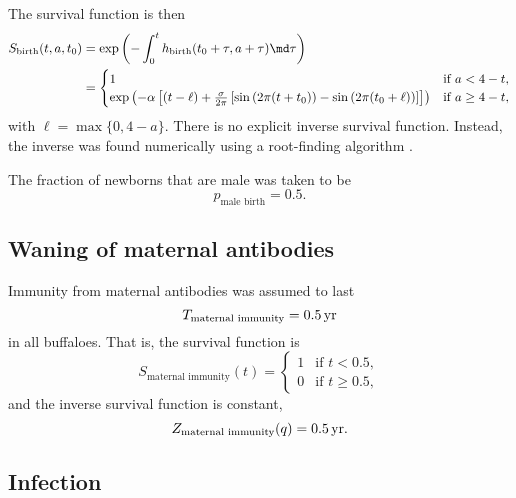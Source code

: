 \documentclass{jpmarticle}
\begin{document}
The survival function is then
\begin{equation}
  \begin{split}
    S_{\text{birth}}(t, a, t_0) &=
    \exp\left(- \int_0^t h_{\text{birth}}(t_0 + \tau, a + \tau) \md
      \tau\right)
    \\
    &=
    \begin{cases}
      1 & \text{if $a < 4 - t$},
      \\
      \exp\left(- \alpha \left[
          (t - \ell)
          + \frac{\sigma}{2 \pi}
          \left[\sin\left(2 \pi (t + t_0)\right)
            - \sin\left(2 \pi (t_0 + \ell)\right)\right]
        \right]
      \right)
      & \text{if $a \geq 4 - t$},
    \end{cases}
  \end{split}
\end{equation}
with $\ell = \max\{0, 4 - a\}$.  There is no explicit inverse survival
function.  Instead, the inverse was found numerically using a
root-finding algorithm \citep{scipy}.

The fraction of newborns that are male was taken to be
\begin{equation}
  p_{\text{male birth}} = 0.5.
\end{equation}


\subsection{Waning of maternal antibodies}

Immunity from maternal antibodies was assumed to last
\begin{equation}
  T_{\text{maternal immunity}} = \unit[0.5]{yr}
\end{equation}
in all buffaloes.  That is, the survival function is
\begin{equation}
  S_{\text{maternal immunity}}(t) =
  \begin{cases}
    1 & \text{if $t < 0.5$},
    \\
    0 & \text{if $t \geq 0.5$},
  \end{cases}
\end{equation}
and the inverse survival function is constant,
\begin{equation}
  Z_{\text{maternal immunity}}(q) = \unit[0.5]{yr}.
\end{equation}


\subsection{Infection}
\end{document}
